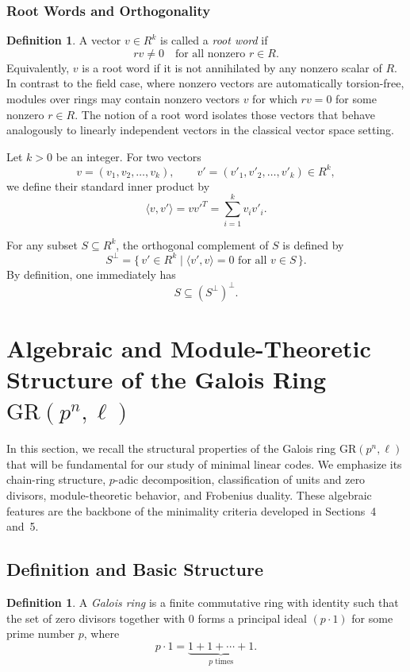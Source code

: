\documentclass[10pt]{article}
\theoremstyle{definition}
\newtheorem{definition}[lem]{Definition}
\begin{document}
\subsubsection{Root Words and Orthogonality}

\begin{definition}\label{Definition 5}
A vector $v \in R^k$ is called a \emph{root word} if
\[
r v \neq 0 \quad \text{for all nonzero } r \in R.
\]
Equivalently, $v$ is a root word if it is not annihilated by any nonzero scalar of $R$. In contrast to the field case, where nonzero vectors are automatically torsion-free, modules over rings may contain nonzero vectors $v$ for which $r v = 0$ for some nonzero $r \in R$. The notion of a root word isolates those vectors that behave analogously to linearly independent vectors in the classical vector space setting.
\end{definition}

Let $k>0$ be an integer. For two vectors
\[
v=(v_1,v_2,\dots,v_k),
\qquad
v'=(v'_1,v'_2,\dots,v'_k) \in R^k,
\]
we define their standard inner product by
\[
\langle v, v' \rangle
= v {v'}^{T}
= \sum_{i=1}^{k} v_i v'_i.
\]

For any subset $S \subseteq R^k$, the orthogonal complement of $S$ is defined by
\[
S^{\perp}
= \{\, v' \in R^k \mid \langle v', v \rangle = 0 \text{ for all } v \in S \,\}.
\]
By definition, one immediately has
\[
S \subseteq (S^{\perp})^{\perp}.
\]



\section{Algebraic and Module-Theoretic Structure of the Galois Ring $\mathrm{GR}(p^{n},\ell)$}\label{Section 3}

In this section, we recall the structural properties of the Galois ring
$\mathrm{GR}(p^{n},\ell)$ that will be fundamental for our study of minimal linear codes.
We emphasize its chain-ring structure, $p$-adic decomposition,
classification of units and zero divisors, module-theoretic behavior,
and Frobenius duality.
These algebraic features are the backbone of the minimality criteria
developed in Sections~4 and~5.


\subsection{Definition and Basic Structure}

\begin{definition}\cite{WZXian}
A \emph{Galois ring} is a finite commutative ring with identity such that
the set of zero divisors together with $0$ forms a principal ideal $(p\cdot 1)$
for some prime number $p$, where
\[
p\cdot 1=\underbrace{1+1+\cdots+1}_{p\text{ times}}.
\]
\end{definition}
\end{document}
